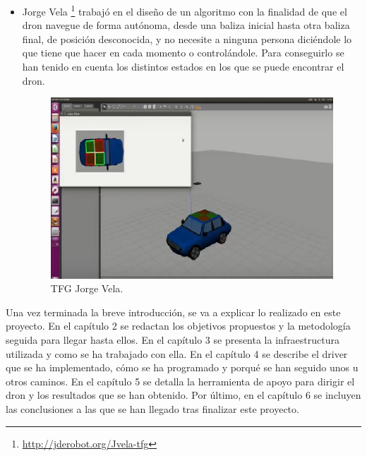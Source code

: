 \begin{itemize}
\item Jorge Vela\cite{jorgeVela} \footnote{\url{http://jderobot.org/Jvela-tfg}} trabajó en el diseño de un algoritmo con la finalidad de que el dron navegue de forma autónoma, desde una baliza inicial hasta otra baliza final, de posición desconocida, y no necesite a ninguna persona diciéndole lo que tiene que hacer en cada momento o controlándole. Para conseguirlo se han tenido en cuenta los distintos estados en los que se puede encontrar el dron.

\begin{figure}[H]
  \centering
  \includegraphics[scale=0.7]{imagenes/Jorge-Vela.jpg}
  \caption{TFG Jorge Vela.}
  \label{fig:jorgeVela}
\end{figure}

\end{itemize}

Una vez terminada la breve introducción, se va a explicar lo realizado en
este proyecto. En el capítulo 2 se redactan los objetivos propuestos y la metodología
seguida para llegar hasta ellos. En el capítulo 3 se presenta la infraestructura utilizada
y como se ha trabajado con ella. En el capítulo 4 se describe el driver que se ha implementado,
cómo se ha programado y porqué se han seguido unos u otros caminos. En el capítulo
5 se detalla la herramienta de apoyo para dirigir el dron y los resultados que se han obtenido.
Por último, en el capítulo 6 se incluyen las conclusiones a las que se han llegado tras
finalizar este proyecto.
